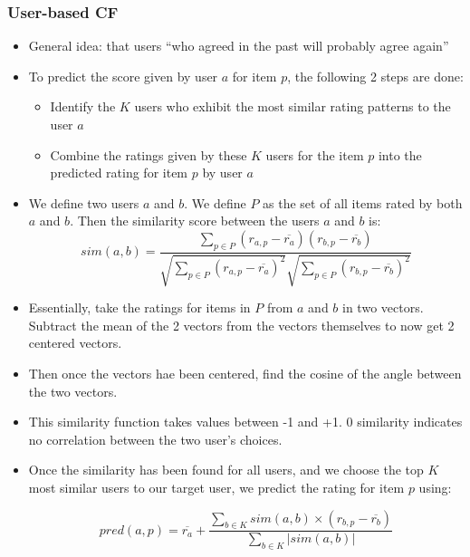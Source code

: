 \documentclass{article}
\begin{document}
\subsubsection{User-based CF}
\begin{itemize}
    \item  General idea: that users “who agreed in the past will probably agree again”
    
    \item To predict the score given by user $a$ for item $p$, the following 2 steps are done:
    \begin{itemize}
        \item Identify the $K$ users who exhibit the most similar rating patterns to the user $a$
        
        \item Combine the ratings given by these $K$ users for the item $p$ into the predicted rating for item $p$ by user $a$
    \end{itemize}
    
    \item We define two users $a$ and $b$. We define $P$ as the set of all items rated by both $a$ and $b$. Then the similarity score between the users $a$ and $b$ is:
    \begin{equation}
        sim(a, b) = \frac{\sum_{p\in P} (r_{a, p} - \overline{r_a}) (r_{b, p} - \overline{r_b})}{\sqrt{\sum_{p\in P} (r_{a, p} - \overline{r_a})^2} \sqrt{ \sum_{p\in P} (r_{b, p} - \overline{r_b})^2}}
    \end{equation}
    
    \item Essentially, take the ratings for items in $P$ from $a$ and $b$ in two vectors. Subtract the mean of the 2 vectors from the vectors themselves to now get 2 centered vectors.
    
    \item Then once the vectors hae been centered, find the cosine of the angle between the two vectors. 
    
    \item This similarity function takes values between -1 and +1. 0 similarity indicates no correlation between the two user's choices. 
    
    \item Once the similarity has been found for all users, and we choose the top $K$ most similar users to our target user, we predict the rating for item $p$ using:
    
    \begin{equation}
        pred(a, p) = \overline{r_a} + \frac{\sum_{b\in K} sim(a, b)\times (r_{b,p} - \overline{r_b})}{\sum_{b\in K}| sim(a, b)|}
    \end{equation}
    

\end{itemize}
\end{document}
